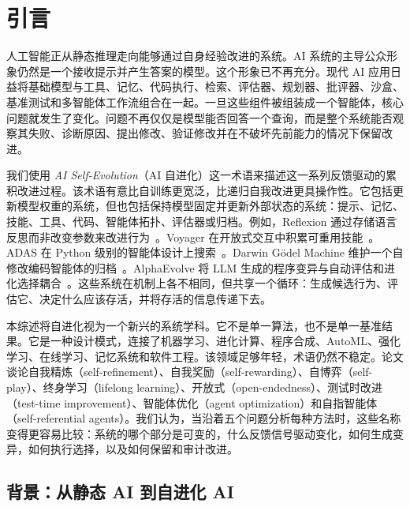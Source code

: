 
\section{引言}\label{ch:intro}

人工智能正从静态推理走向能够通过自身经验改进的系统。AI 系统的主导公众形象仍然是一个接收提示并产生答案的模型。这个形象已不再充分。现代 AI 应用日益将基础模型与工具、记忆、代码执行、检索、评估器、规划器、批评器、沙盒、基准测试和多智能体工作流组合在一起。一旦这些组件被组装成一个智能体，核心问题就发生了变化。问题不再仅仅是模型能否回答一个查询，而是整个系统能否观察其失败、诊断原因、提出修改、验证修改并在不破坏先前能力的情况下保留改进。

我们使用 \emph{AI Self-Evolution}（AI 自进化）这一术语来描述这一系列反馈驱动的累积改进过程。该术语有意比自训练更宽泛，比递归自我改进更具操作性。它包括更新模型权重的系统，但也包括保持模型固定并更新外部状态的系统：提示、记忆、技能、工具、代码、智能体拓扑、评估器或归档。例如，Reflexion 通过存储语言反思而非改变参数来改进行为~\citep{reflexion2023}。Voyager 在开放式交互中积累可重用技能~\citep{voyager2023}。ADAS 在 Python 级别的智能体设计上搜索~\citep{adas2025}。Darwin G\"{o}del Machine 维护一个自修改编码智能体的归档~\citep{darwingodelmachine2025}。AlphaEvolve 将 LLM 生成的程序变异与自动评估和进化选择耦合~\citep{alphaevolve2025}。这些系统在机制上各不相同，但共享一个循环：生成候选行为、评估它、决定什么应该存活，并将存活的信息传递下去。

本综述将自进化视为一个新兴的系统学科。它不是单一算法，也不是单一基准结果。它是一种设计模式，连接了机器学习、进化计算、程序合成、AutoML、强化学习、在线学习、记忆系统和软件工程。该领域足够年轻，术语仍然不稳定。论文谈论自我精炼（self-refinement）、自我奖励（self-rewarding）、自博弈（self-play）、终身学习（lifelong learning）、开放式（open-endedness）、测试时改进（test-time improvement）、智能体优化（agent optimization）和自指智能体（self-referential agents）。我们认为，当沿着五个问题分析每种方法时，这些名称变得更容易比较：系统的哪个部分是可变的，什么反馈信号驱动变化，如何生成变异，如何执行选择，以及如何保留和审计改进。

\subsection{背景：从静态 AI 到自进化 AI}\label{sec:intro-background}

